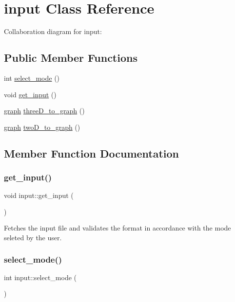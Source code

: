 \hypertarget{classinput}{}\section{input Class Reference}
\label{classinput}


Collaboration diagram for input\+:
\subsection*{Public Member Functions}
\begin{DoxyCompactItemize}
\item 
int \hyperlink{classinput_a09da13fb41c30064a99da7776c0af0e6}{select\+\_\+mode} ()
\item 
void \hyperlink{classinput_aa8115a97b7b36912fd20a24fba00f0cc}{get\+\_\+input} ()
\item 
\hyperlink{structgraph}{graph} \hyperlink{classinput_aa48aa4244183a1c9638307d13caeeeea}{three\+D\+\_\+to\+\_\+graph} ()
\item 
\hyperlink{structgraph}{graph} \hyperlink{classinput_a42bcdd5bfcccd4cab629d115cd56a846}{two\+D\+\_\+to\+\_\+graph} ()
\end{DoxyCompactItemize}


\subsection{Member Function Documentation}
\mbox{\label{classinput_aa8115a97b7b36912fd20a24fba00f0cc}} 
\subsubsection{\texorpdfstring{get\+\_\+input()}{get\_input()}}
{\footnotesize\ttfamily void input\+::get\+\_\+input (\begin{DoxyParamCaption}{ }\end{DoxyParamCaption})\hspace{0.3cm}{\ttfamily [inline]}}

Fetches the input file and validates the format in accordance with the mode seleted by the user.\mbox{\label{classinput_a09da13fb41c30064a99da7776c0af0e6}} 
\subsubsection{\texorpdfstring{select\+\_\+mode()}{select\_mode()}}
{\footnotesize\ttfamily int input\+::select\+\_\+mode (\begin{DoxyParamCaption}{ }\end{DoxyParamCaption})\hspace{0.3cm}{\ttfamily [inline]}}

